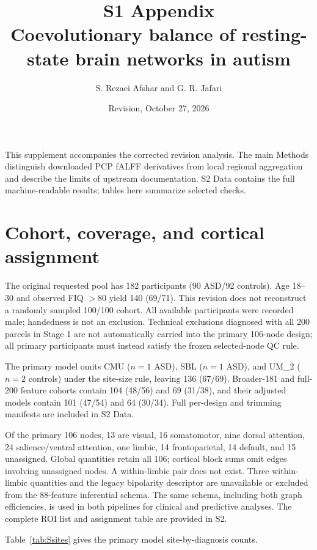\documentclass[10pt,letterpaper]{article}
\title{S1 Appendix\\Coevolutionary balance of resting-state brain networks in autism}
\author{S. Rezaei Afshar and G. R. Jafari}
\date{Revision, October 27, 2026}
\begin{document}
\maketitle
\noindent This supplement accompanies the corrected revision analysis. The main Methods distinguish downloaded PCP fALFF derivatives from local regional aggregation and describe the limits of upstream documentation.
S2 Data contains the full machine-readable results; tables here summarize selected checks.
\renewcommand{\thetable}{S\arabic{table}}
\renewcommand{\thefigure}{S\arabic{figure}}

\section*{Cohort, coverage, and cortical assignment}
The original requested pool has 182 participants (90 ASD/92 controls). Age 18--30
and observed FIQ $>80$ yield 140 (69/71). This revision does not reconstruct a
randomly sampled 100/100 cohort. All available participants were recorded male;
handedness is not an exclusion. Technical exclusions diagnosed with all 200
parcels in Stage 1 are not automatically carried into the primary 106-node design;
all primary participants must instead satisfy the frozen selected-node QC rule.

The primary model omits CMU ($n=1$ ASD), SBL ($n=1$ ASD), and UM\_2 ($n=2$
controls) under the site-size rule, leaving 136 (67/69). Broader-181 and full-200
feature cohorts contain 104 (48/56) and 69 (31/38), and their adjusted models
contain 101 (47/54) and 64 (30/34). Full per-design and trimming manifests are
included in S2 Data.

Of the primary 106 nodes, 13 are visual, 16 somatomotor, nine dorsal attention,
24 salience/ventral attention, one limbic, 14 frontoparietal, 14 default, and 15
unassigned. Global quantities retain all 106; cortical block sums omit edges
involving unassigned nodes. A within-limbic pair does not exist. Three
within-limbic quantities and the legacy bipolarity descriptor are unavailable or
excluded from the 88-feature inferential schema. The same schema, including
both graph efficiencies, is used in both pipelines for clinical and predictive
analyses. The complete ROI list and assignment table are provided in S2.

Table~\ref{tab:Ssites} gives the primary model site-by-diagnosis counts.

\end{document}
